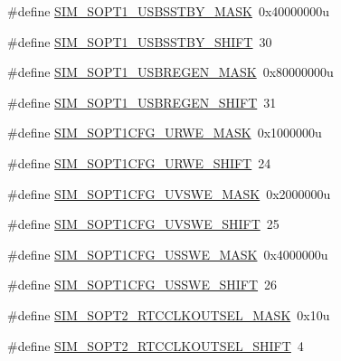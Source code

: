 \begin{DoxyCompactItemize}
\item 
\#define \hyperlink{group___s_i_m___register___masks_ga93a808f7a1d75e26bc3ed565ab257617}{S\+I\+M\+\_\+\+S\+O\+P\+T1\+\_\+\+U\+S\+B\+S\+S\+T\+B\+Y\+\_\+\+M\+A\+SK}~0x40000000u
\item 
\#define \hyperlink{group___s_i_m___register___masks_ga8a24334d1be5bd01017bd364dd53f268}{S\+I\+M\+\_\+\+S\+O\+P\+T1\+\_\+\+U\+S\+B\+S\+S\+T\+B\+Y\+\_\+\+S\+H\+I\+FT}~30
\item 
\#define \hyperlink{group___s_i_m___register___masks_gac60c367119b3dcc752c4cf857b8a59b5}{S\+I\+M\+\_\+\+S\+O\+P\+T1\+\_\+\+U\+S\+B\+R\+E\+G\+E\+N\+\_\+\+M\+A\+SK}~0x80000000u
\item 
\#define \hyperlink{group___s_i_m___register___masks_ga99e46c34c02e39338c9b80775bad09db}{S\+I\+M\+\_\+\+S\+O\+P\+T1\+\_\+\+U\+S\+B\+R\+E\+G\+E\+N\+\_\+\+S\+H\+I\+FT}~31
\item 
\#define \hyperlink{group___s_i_m___register___masks_gaa4e1ee8f60c8c15ad553c2dfb82c2039}{S\+I\+M\+\_\+\+S\+O\+P\+T1\+C\+F\+G\+\_\+\+U\+R\+W\+E\+\_\+\+M\+A\+SK}~0x1000000u
\item 
\#define \hyperlink{group___s_i_m___register___masks_ga07bf2ffc61aacca96748747fa8df7062}{S\+I\+M\+\_\+\+S\+O\+P\+T1\+C\+F\+G\+\_\+\+U\+R\+W\+E\+\_\+\+S\+H\+I\+FT}~24
\item 
\#define \hyperlink{group___s_i_m___register___masks_ga29e593e134a31bed2dbd3673c51cb330}{S\+I\+M\+\_\+\+S\+O\+P\+T1\+C\+F\+G\+\_\+\+U\+V\+S\+W\+E\+\_\+\+M\+A\+SK}~0x2000000u
\item 
\#define \hyperlink{group___s_i_m___register___masks_ga74d94a9794e03091f54b76a5c18c58b8}{S\+I\+M\+\_\+\+S\+O\+P\+T1\+C\+F\+G\+\_\+\+U\+V\+S\+W\+E\+\_\+\+S\+H\+I\+FT}~25
\item 
\#define \hyperlink{group___s_i_m___register___masks_ga0b7d9fe471d5d689ba3feb001cf69b60}{S\+I\+M\+\_\+\+S\+O\+P\+T1\+C\+F\+G\+\_\+\+U\+S\+S\+W\+E\+\_\+\+M\+A\+SK}~0x4000000u
\item 
\#define \hyperlink{group___s_i_m___register___masks_ga6984c7260abd4b7caccff970332eb4be}{S\+I\+M\+\_\+\+S\+O\+P\+T1\+C\+F\+G\+\_\+\+U\+S\+S\+W\+E\+\_\+\+S\+H\+I\+FT}~26
\item 
\#define \hyperlink{group___s_i_m___register___masks_ga4ecc21f62a92e94e5f507a6bb5e44062}{S\+I\+M\+\_\+\+S\+O\+P\+T2\+\_\+\+R\+T\+C\+C\+L\+K\+O\+U\+T\+S\+E\+L\+\_\+\+M\+A\+SK}~0x10u
\item 
\#define \hyperlink{group___s_i_m___register___masks_gaa4b7f7e8f1999ec0d56a1224cf7eb35d}{S\+I\+M\+\_\+\+S\+O\+P\+T2\+\_\+\+R\+T\+C\+C\+L\+K\+O\+U\+T\+S\+E\+L\+\_\+\+S\+H\+I\+FT}~4

\end{DoxyCompactItemize}
